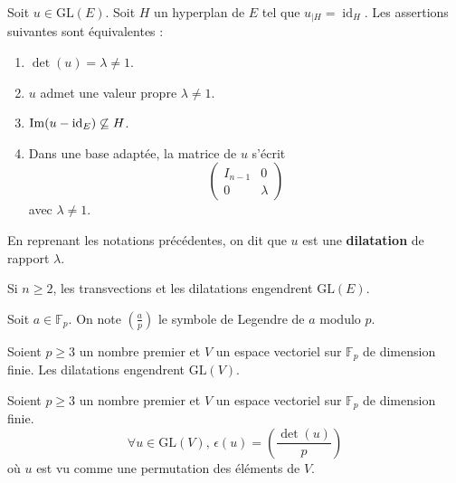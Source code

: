   \begin{proposition}
    Soit $u \in \mathrm{GL}(E)$. Soit $H$ un hyperplan de $E$ tel que $u_{|H} = \operatorname{id}_H$. Les assertions suivantes sont équivalentes :
    \begin{enumerate}[label=(\roman*)]
      \item $\det(u) = \lambda \neq 1$.
      \item $u$ admet une valeur propre $\lambda \neq 1$.
      \item $\mathrm{Im}(u - \operatorname{id}_E) \not\subseteq H$.
      \item Dans une base adaptée, la matrice de $u$ s'écrit
      \[
        \begin{pmatrix}
          I_{n-1} & 0 \\
          0 & \lambda
        \end{pmatrix}
      \]
      avec $\lambda \neq 1$.
    \end{enumerate}
  \end{proposition}
  
  \begin{definition}
    En reprenant les notations précédentes, on dit que $u$ est une \textbf{dilatation} de rapport $\lambda$.
  \end{definition}

  \begin{theorem}
    Si $n \geq 2$, les transvections et les dilatations engendrent $\mathrm{GL}(E)$.
  \end{theorem}


  \begin{notation}
    Soit $a \in \mathbb{F}_p$. On note $\left( \frac{a}{p} \right)$ le symbole de Legendre de $a$ modulo $p$.
  \end{notation}

  \begin{lemma}
    Soient $p \geq 3$ un nombre premier et $V$ un espace vectoriel sur $\mathbb{F}_p$ de dimension finie. Les dilatations engendrent $\mathrm{GL}(V)$.
  \end{lemma}


  \begin{application}
    Soient $p \geq 3$ un nombre premier et $V$ un espace vectoriel sur $\mathbb{F}_p$ de dimension finie.
    \[ \forall u \in \mathrm{GL}(V), \, \epsilon(u) = \left( \frac{\det(u)}{p} \right) \]
    où $u$ est vu comme une permutation des éléments de $V$.
  \end{application}

